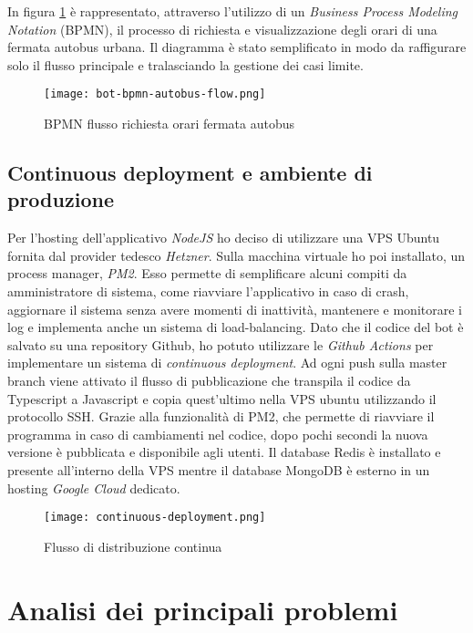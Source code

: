 \noindent In figura \ref{fig:bpmn_autobus_flow} è rappresentato, attraverso l'utilizzo di un \textit{Business Process Modeling Notation} (BPMN), il processo di richiesta e visualizzazione degli orari di una fermata autobus urbana. Il diagramma è stato semplificato in modo da raffigurare solo il flusso principale e tralasciando la gestione dei casi limite.

\begin{figure}[h]
\centering
\texttt{[image: bot-bpmn-autobus-flow.png]}
\caption{BPMN flusso richiesta orari fermata autobus}
\label{fig:bpmn_autobus_flow}
\end{figure}

\newpage
\newpage

\subsection{Continuous deployment e ambiente di produzione}
\label{sec:produzione}

Per l'hosting dell'applicativo \textit{NodeJS} ho deciso di utilizzare una VPS Ubuntu fornita dal provider tedesco \textit{Hetzner}. Sulla macchina virtuale ho poi installato, un process manager, \textit{PM2}. Esso permette di semplificare alcuni compiti da amministratore di sistema, come riavviare l'applicativo in caso di crash, aggiornare il sistema senza avere momenti di inattività, mantenere e monitorare i log e implementa anche un sistema di load-balancing. Dato che il codice del bot è salvato su una repository Github, ho potuto utilizzare le \textit{Github Actions} per implementare un sistema di \textit{continuous deployment}. Ad ogni push sulla master branch viene attivato il flusso di pubblicazione che transpila il codice da Typescript a Javascript e copia quest'ultimo nella VPS ubuntu utilizzando il protocollo SSH. Grazie alla funzionalità di PM2, che permette di riavviare il programma in caso di cambiamenti nel codice, dopo pochi secondi la nuova versione è pubblicata e disponibile agli utenti. Il database Redis è installato e presente all'interno della VPS mentre il database MongoDB è esterno in un hosting \textit{Google Cloud} dedicato.

\begin{figure}[h]
\centering
\texttt{[image: continuous-deployment.png]}
\caption{Flusso di distribuzione continua}
\label{fig:continuous_deployment}
\end{figure}

\section{Analisi dei principali problemi}
\label{sec:problemi}

